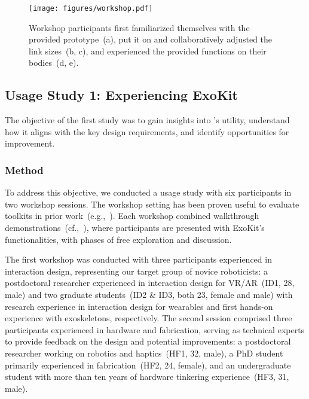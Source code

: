 \begin{figure*}[t]
    \centering
    \texttt{[image: figures/workshop.pdf]}
    \caption{Workshop participants first familiarized themselves with the provided prototype~(a), put it on and collaboratively adjusted the link sizes~(b, c), and experienced the provided functions on their bodies~(d, e).}
    \label{fig:workshop}
\end{figure*}

\subsection{Usage Study 1: Experiencing ExoKit}
The objective of the first study was to gain insights into \toolkit's utility, understand how it aligns with the key design requirements, and identify opportunities for improvement. 

\subsubsection{Method}
To address this objective, we conducted a usage study with six participants in two workshop sessions. The workshop setting has been proven useful to evaluate toolkits in prior work~(e.g.,~\cite{pfeiffer_2016,sabnis_2023,lei_2022}). Each workshop combined walkthrough demonstrations~(cf.,~\cite{ledo_2018}), where participants are presented with ExoKit's functionalities, with phases of free exploration and discussion. 

 The first workshop was conducted with three participants experienced in interaction design, representing our target group of novice roboticists: a postdoctoral researcher experienced in interaction design for VR/AR~(ID1, 28, male) and two graduate students~(ID2 \& ID3, both 23, female and male) with research experience in interaction design for wearables and first hands-on experience with exoskeletons, respectively. The second session comprised three participants experienced in hardware and fabrication, serving as technical experts to provide feedback on the design and potential improvements: a postdoctoral researcher working on robotics and haptics~(HF1, 32, male), a PhD student primarily experienced in fabrication~(HF2, 24, female), and an undergraduate student with more than ten years of hardware tinkering experience~(HF3, 31, male). 

